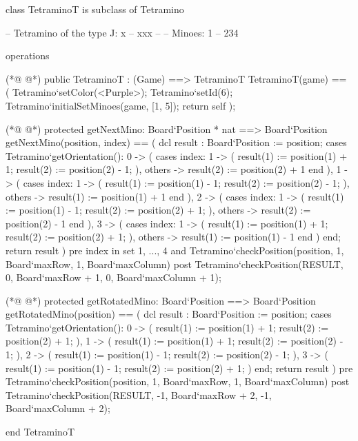 \begin{vdmpp}[breaklines=true]
class TetraminoT is subclass of Tetramino
  
 -- Tetramino of the type J:  x
 --       xxx
 --
 -- Minoes:        1
 --         234
 

 operations
 
(*@
\label{TetraminoT:12}
@*)
  public TetraminoT : (Game) ==> TetraminoT
  TetraminoT(game) == (
   Tetramino`setColor(<Purple>);
   Tetramino`setId(6);
   Tetramino`initialSetMinoes(game, [1, 5]);
   return self
  );

(*@
\label{getNextMino:20}
@*)
  protected getNextMino: Board`Position * nat ==> Board`Position
  getNextMino(position, index) == (
   dcl result : Board`Position := position;
   cases Tetramino`getOrientation():
    0 -> (
     cases index:
      1 -> (
       result(1) := position(1) + 1;
       result(2) := position(2) - 1;
      ),
      others -> result(2) := position(2) + 1
     end
    ),
    1 -> (
     cases index:
      1 -> (
       result(1) := position(1) - 1;
       result(2) := position(2) - 1;
      ),
      others -> result(1) := position(1) + 1
     end
    ),
    2 -> (
     cases index:
      1 -> (
       result(1) := position(1) - 1;
       result(2) := position(2) + 1;
      ),
      others -> result(2) := position(2) - 1
     end
    ),
    3 -> (
     cases index:
      1 -> (
       result(1) := position(1) + 1;
       result(2) := position(2) + 1;
      ),
      others -> result(1) := position(1) - 1
     end
    )
   end;
   return result
  )
  pre index in set {1, ..., 4} 
   and Tetramino`checkPosition(position, 1, Board`maxRow, 1, Board`maxColumn)
  post Tetramino`checkPosition(RESULT, 0, Board`maxRow + 1, 0, Board`maxColumn + 1);
  
(*@
\label{getRotatedMino:67}
@*)
  protected getRotatedMino: Board`Position ==> Board`Position
  getRotatedMino(position) == (
   dcl result : Board`Position := position;
   cases Tetramino`getOrientation():
    0 -> (
     result(1) := position(1) + 1; 
     result(2) := position(2) + 1;
     ),
    1 -> (
     result(1) := position(1) + 1; 
     result(2) := position(2) - 1;
     ),
    2 -> (
     result(1) := position(1) - 1; 
     result(2) := position(2) - 1;
     ),
    3 -> (
     result(1) := position(1) - 1; 
     result(2) := position(2) + 1;
     )
   end;
   return result
  )
  pre Tetramino`checkPosition(position, 1, Board`maxRow, 1, Board`maxColumn)
  post Tetramino`checkPosition(RESULT, -1, Board`maxRow + 2, -1, Board`maxColumn + 2);

end TetraminoT
\end{vdmpp}
